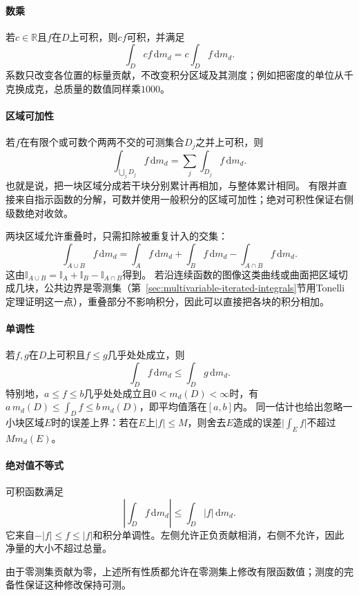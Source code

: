 \paragraph{数乘}

若$c\in\mathbb R$且$f$在$D$上可积，则$cf$可积，并满足
\[
 \int_Dcf\,\mathrm dm_d=c\int_Df\,\mathrm dm_d.
\]
系数只改变各位置的标量贡献，不改变积分区域及其测度；例如把密度的单位从千克换成克，总质量的数值同样乘$1000$。

\paragraph{区域可加性}

若$f$在有限个或可数个两两不交的可测集合$D_j$之并上可积，则
\[
 \int_{\bigcup_jD_j}f\,\mathrm dm_d=\sum_j\int_{D_j}f\,\mathrm dm_d.
\]
也就是说，把一块区域分成若干块分别累计再相加，与整体累计相同。
有限并直接来自指示函数的分解，可数并使用一般积分的区域可加性；绝对可积性保证右侧级数绝对收敛。

两块区域允许重叠时，只需扣除被重复计入的交集：
\[
 \int_{A\cup B}f\,\mathrm dm_d
 =\int_Af\,\mathrm dm_d+\int_Bf\,\mathrm dm_d-\int_{A\cap B}f\,\mathrm dm_d.
\]
这由$\mathbb I_{A\cup B}=\mathbb I_A+\mathbb I_B-\mathbb I_{A\cap B}$得到。
若沿连续函数的图像这类曲线或曲面把区域切成几块，公共边界是零测集（第~\ref{sec:multivariable-iterated-integrals}节用Tonelli定理证明这一点），重叠部分不影响积分，因此可以直接把各块的积分相加。

\paragraph{单调性}

若$f,g$在$D$上可积且$f\leq g$几乎处处成立，则
\[
 \int_Df\,\mathrm dm_d\leq\int_Dg\,\mathrm dm_d.
\]
特别地，$a\leq f\leq b$几乎处处成立且$0<m_d(D)<\infty$时，有$a\,m_d(D)\leq\int_Df\leq b\,m_d(D)$，即平均值落在$[a,b]$内。
同一估计也给出忽略一小块区域$E$时的误差上界：若在$E$上$|f|\leq M$，则舍去$E$造成的误差$\bigl|\int_Ef\bigr|$不超过$Mm_d(E)$。

\paragraph{绝对值不等式}

可积函数满足
\[
 \left|\int_Df\,\mathrm dm_d\right|\leq\int_D|f|\,\mathrm dm_d.
\]
它来自$-|f|\leq f\leq|f|$和积分单调性。左侧允许正负贡献相消，右侧不允许，因此净量的大小不超过总量。

由于零测集贡献为零，上述所有性质都允许在零测集上修改有限函数值；测度的完备性保证这种修改保持可测。

